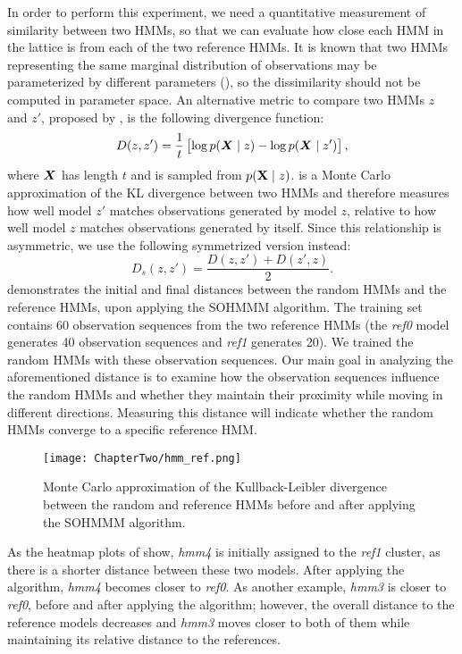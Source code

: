 In order to perform this experiment, we need a quantitative measurement of similarity between two HMMs, so that we can evaluate how close each HMM in the lattice is from each of the two reference HMMs. It is known that two HMMs representing the same marginal distribution of observations may be parameterized by different parameters (\citet{Rabiner1989}), so the dissimilarity should not be computed in parameter space. An alternative metric to compare two HMMs $z$ and $z'$, proposed by \citet{Juang1985}, is the following divergence function:
\begin{equation}
    D(z, z') = \frac{1}{t}\left[\log p({\bm{X}} \mid z) - \log p({\bm{X}} \mid z')\right],
    \label{eq:hmm_div}
\end{equation}
where ${\bm{X}}$ has length $t$ and is sampled from $p({\mathbf{X}} \mid z)$.  is a Monte Carlo approximation of the KL divergence between two HMMs and therefore measures how well model $z'$ matches observations generated by model $z$, relative to how well model $z$ matches observations generated by itself. Since this relationship is asymmetric, we use the following symmetrized version instead:
\begin{equation}
    D_{s}(z,z') = \frac{D(z,z')+D(z',z)}{2}.
    \label{eq:hmm_div_sym}
\end{equation}
 demonstrates the initial and final distances between the random HMMs and the reference HMMs, upon applying the SOHMMM algorithm. The training set contains 60 observation sequences from the two reference HMMs (the \textit{ref0} model generates 40 observation sequences and \textit{ref1} generates 20). We trained the random HMMs with these observation sequences.
Our main goal in analyzing the aforementioned distance is to examine how the observation sequences influence the random HMMs and whether they maintain their proximity while moving in different directions. Measuring this distance will indicate whether the random HMMs converge to a specific reference HMM.

\begin{figure}[h]
    \centering
    \texttt{[image: ChapterTwo/hmm\_ref.png]}
    \caption{Monte Carlo approximation of the Kullback-Leibler divergence between the random and reference HMMs before and after applying the SOHMMM algorithm.}
    \label{fig:sohmmm_distances}
\end{figure}

As the heatmap plots of  show, \textit{hmm4} is initially assigned to the \textit{ref1} cluster, as there is a shorter distance between these two models. After applying the algorithm, \textit{hmm4} becomes closer to \textit{ref0}. As another example, \textit{hmm3} is closer to \textit{ref0}, before and after applying the algorithm; however, the overall distance to the reference models decreases and \textit{hmm3} moves closer to both of them while maintaining its relative distance to the references.

